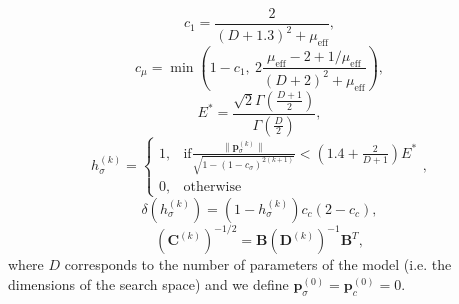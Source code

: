 \begin{equation}
c_1=\frac{2}{(D+1.3)^2+\mu_{\mathrm{eff}}},
\end{equation}
\begin{equation}
c_\mu=\min\left(1-c_1,\ 2\frac{\mu_{\mathrm{eff}}-2+1/\mu_{\mathrm{eff}}}{(D+2)^2+\mu_{\mathrm{eff}}}\right),
\end{equation}
\begin{equation}
E^*=\frac{\sqrt{2}\Gamma\left(\frac{D+1}{2}\right)}{\Gamma\left(\frac{D}{2}\right)},
\end{equation}
\begin{equation}h_\sigma^{(k)}=
\begin{cases} 
      1, & \mathrm{if} \frac{\|\mathbf{p}^{(k)}_\sigma\|}{\sqrt{1-\left(1-c_\sigma\right)^{2(k+1)}}}<\left(1.4+\frac{2}{D+1}\right)E^*\\
      0, & \mathrm{otherwise}
   \end{cases},
\end{equation}
\begin{equation}
\delta\left(h_\sigma^{(k)}\right)=\left(1-h_\sigma^{(k)}\right)c_c\left(2-c_c\right),
\end{equation}
\begin{equation}
\left(\mathbf{C}^{(k)}\right)^{-1/2}=\mathbf{B}\left(\mathbf{D}^{(k)}\right)^{-1}\mathbf{B}^T,
\end{equation}
\noindent where $D$ corresponds to the number of parameters of the model (i.e. the dimensions of the search space) and we define $\mathbf{p}_\sigma^{(0)}=\mathbf{p}_c^{(0)}=0$.












